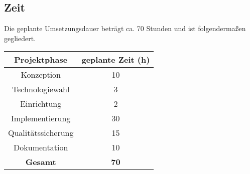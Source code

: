\subsection{Zeit}
Die geplante Umsetzungsdauer beträgt ca. 70 Stunden und ist folgendermaßen
gegliedert.

\begin{center}
    \begin{tabular}{ |c|c| }
        \hline
        \textbf{Projektphase} & \textbf{geplante Zeit (h)} \\ \hline
        Konzeption            & 10                         \\
        Technologiewahl       & 3                          \\
        Einrichtung           & 2                          \\
        Implementierung       & 30                         \\
        Qualitätssicherung    & 15                         \\
        Dokumentation         & 10                         \\ \hline
        \textbf{Gesamt}       & \textbf{70}                \\
        \hline
    \end{tabular}
\end{center}